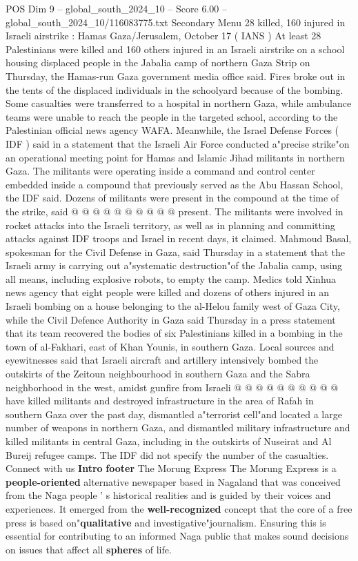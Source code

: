 \begin{textsample}{POS Dim 9 – global\_south\_2024\_10 – Score 6.00 – global\_south\_2024\_10/116083775.txt}  \label{ex:f9_pos_085}
Secondary Menu 28 killed, 160 injured in Israeli airstrike : Hamas Gaza/Jerusalem, October 17 ( IANS ) At least 28 Palestinians were killed and 160 others injured in an Israeli airstrike on a school housing displaced people in the Jabalia camp of northern Gaza Strip on Thursday, the Hamas-run Gaza government media office said.
Fires broke out in the tents of the displaced individuals in the schoolyard because of the bombing.
Some casualties were transferred to a hospital in northern Gaza, while ambulance teams were unable to reach the people in the targeted school, according to the Palestinian official news agency WAFA.
Meanwhile, the Israel Defense Forces ( IDF ) said in a statement that the Israeli Air Force conducted a"precise strike"on an operational meeting point for Hamas and Islamic Jihad militants in northern Gaza.
The militants were operating inside a command and control center embedded inside a compound that previously served as the Abu Hassan School, the IDF said.
Dozens of militants were present in the compound at the time of the strike, said @ @ @ @ @ @ @ @ @ @ present.
The militants were involved in rocket attacks into the Israeli territory, as well as in planning and committing attacks against IDF troops and Israel in recent days, it claimed.
Mahmoud Basal, spokesman for the Civil Defense in Gaza, said Thursday in a statement that the Israeli army is carrying out a"systematic destruction"of the Jabalia camp, using all means, including explosive robots, to empty the camp.
Medics told Xinhua news agency that eight people were killed and dozens of others injured in an Israeli bombing on a house belonging to the al-Helou family west of Gaza City, while the Civil Defence Authority in Gaza said Thursday in a press statement that its team recovered the bodies of six Palestinians killed in a bombing in the town of al-Fakhari, east of Khan Younis, in southern Gaza.
Local sources and eyewitnesses said that Israeli aircraft and artillery intensively bombed the outskirts of the Zeitoun neighbourhood in southern Gaza and the Sabra neighborhood in the west, amidst gunfire from Israeli @ @ @ @ @ @ @ @ @ @ have killed militants and destroyed infrastructure in the area of Rafah in southern Gaza over the past day, dismantled a"terrorist cell"and located a large number of weapons in northern Gaza, and dismantled military infrastructure and killed militants in central Gaza, including in the outskirts of Nuseirat and Al Bureij refugee camps.
The IDF did not specify the number of the casualties.
Connect with us \textbf{Intro} \textbf{footer} The Morung Express The Morung Express is a \textbf{people-oriented} alternative newspaper based in Nagaland that was conceived from the Naga people ' s historical realities and is guided by their voices and experiences.
It emerged from the \textbf{well-recognized} concept that the core of a free press is based on"\textbf{qualitative} and investigative"journalism.
Ensuring this is essential for contributing to an informed Naga public that makes sound decisions on issues that affect all \textbf{spheres} of life.

\end{textsample}
